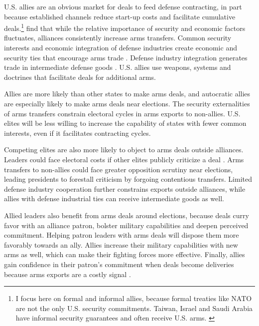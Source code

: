 \documentclass[12pt]{article}
\begin{document}
U.S. allies are an obvious market for deals to feed defense contracting, in part because established channels reduce start-up costs and facilitate cumulative deals.\footnote{I focus here on formal and informal allies, because formal treaties like NATO are not the only U.S. security commitments. Taiwan, Israel and Saudi Arabia have informal security guarantees and often receive U.S. arms. \citep{Yarhi-Miloetal2016}}
\citet{Thurneretal2019} find that while the relative importance of security and economic factors fluctuates, alliances consistently increase arms transfers.
Common security interests and economic integration of defense industries create economic and security ties that encourage arms trade \citep{Bitzinger1994}. 
Defense industry integration generates trade in intermediate defense goods \citep{Brooks2005}. 
U.S. allies use weapons, systems and doctrines that facilitate deals for additional arms. 


Allies are more likely than other states to make arms deals, and autocratic allies are especially likely to make arms deals near elections. 
The security externalities of arms transfers constrain electoral cycles in arms exports to non-allies. 
U.S. elites will be less willing to increase the capability of states with fewer common interests, even if it facilitates contracting cycles.


Competing elites are also more likely to object to arms deals outside alliances.
Leaders could face electoral costs if other elites publicly criticize a deal \citep{Saunders2022}.
Arms transfers to non-allies could face greater opposition scrutiny near elections, leading presidents to forestall criticism by forgoing contentious transfers.
Limited defense industry cooperation further constrains exports outside alliances, while allies with defense industrial ties can receive intermediate goods as well.


Allied leaders also benefit from arms deals around elections, because deals curry favor with an alliance patron, bolster military capabilities and deepen perceived commitment.
Helping patron leaders with arms deals will dispose them more favorably towards an ally. 
Allies increase their military capabilities with new arms as well, which can make their fighting forces more effective. 
Finally, allies gain confidence in their patron's commitment when deals become deliveries because arms exports are a costly signal \citep{McManusYarhi-Milo2017}.
\end{document}
